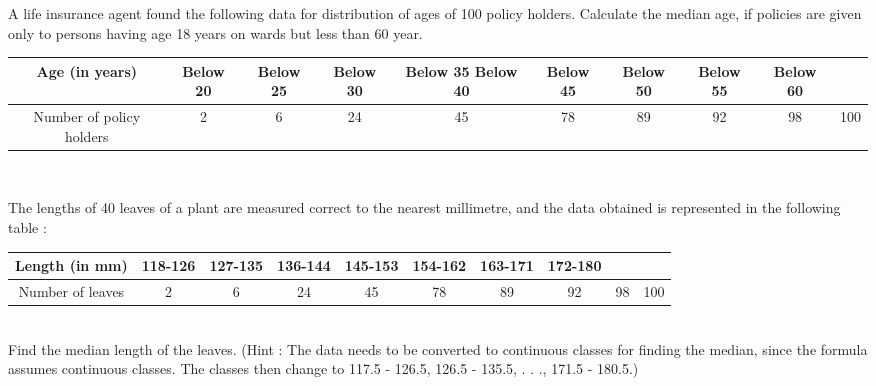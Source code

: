 \item A life insurance agent found the following data for distribution of ages of 100 policy
holders. Calculate the median age, if policies are given only to persons having age 18
years on wards but less than 60 year.
\begin{tabular}{|c|c|c|c|c|c|c|c|c|c|}
\hline
Age (in years)&Below 20&Below 25&Below 30&Below 35 Below 40& Below 45& Below 50& Below 55& Below 60\\
\hline
Number of policy holders&2&6&24&45&78&89&92&98&100\\
\hline
\end{tabular}\\
\item The lengths of 40 leaves of a plant are measured correct to the nearest millimetre, and
the data obtained is represented in the following table :
\begin{tabular}{|c|c|c|c|c|c|c|c|c|c|}
\hline
Length (in mm)&118-126&127-135&136-144&145-153&154-162&163-171&172-180\\
\hline
Number of leaves&2&6&24&45&78&89&92&98&100\\
\hline
\end{tabular}\\
Find the median length of the leaves.
(Hint : The data needs to be converted to continuous classes for finding the median,
since the formula assumes continuous classes. The classes then change to
117.5 - 126.5, 126.5 - 135.5, . . ., 171.5 - 180.5.)
%
%
%
%

